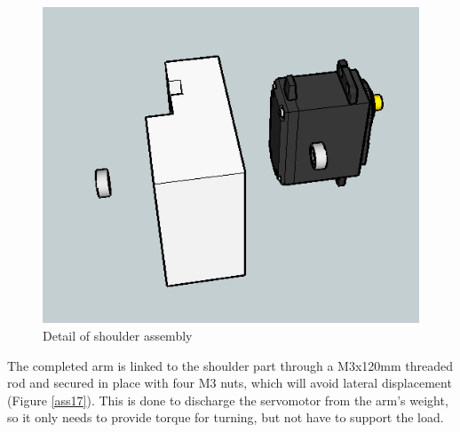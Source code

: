 

	\begin{figure}[H]
			\centering
			\includegraphics[scale=0.5]{images/Assembly/15.png}
			\caption{Detail of shoulder assembly }
			\label{ass15}
	\end{figure}
	\bigskip



The completed arm is linked to the shoulder part through a M3x120mm threaded rod and secured in place with four M3 nuts, which will avoid lateral displacement  (Figure \ref{ass17}). This is done to discharge the servomotor from the arm's weight, so it only needs to provide torque for turning, but not have to support the load.\\

